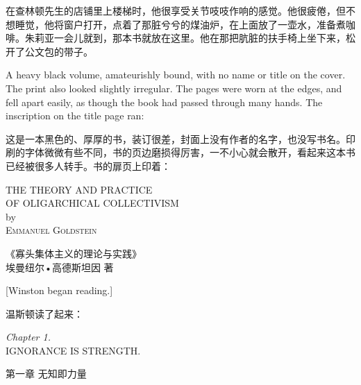 \begin{paracol}{2}
\switchcolumn

在查林顿先生的店铺里上楼梯时，他很享受关节吱吱作响的感觉。他很疲倦，但不想睡觉，他将窗户打开，点着了那脏兮兮的煤油炉，在上面放了一壶水，准备煮咖啡。朱莉亚一会儿就到，那本书就放在这里。他在那把肮脏的扶手椅上坐下来，松开了公文包的带子。

\switchcolumn*

A heavy black volume, amateurishly bound, with no name or title on the
cover. The print also looked slightly irregular. The pages were worn at
the edges, and fell apart easily, as though the book had passed through
many hands. The inscription on the title page ran:

\switchcolumn

这是一本黑色的、厚厚的书，装订很差，封面上没有作者的名字，也没写书名。印刷的字体微微有些不同，书的页边磨损得厉害，一不小心就会散开，看起来这本书已经被很多人转手。书的扉页上印着：

\switchcolumn*

\begin{center}
THE THEORY AND PRACTICE\\
OF OLIGARCHICAL COLLECTIVISM\\
by\\
\textsc{Emmanuel Goldstein}
\end{center}

\switchcolumn

\begin{center}
  《寡头集体主义的理论与实践》\\
  埃曼纽尔•高德斯坦因 著
\end{center}

\switchcolumn*

[Winston began reading.]

\switchcolumn

温斯顿读了起来：

\switchcolumn*

\begin{center}
\emph{Chapter 1.}\\
IGNORANCE IS STRENGTH.
\end{center}

\switchcolumn

\begin{center}
第一章 无知即力量
\end{center}

\switchcolumn*


\end{paracol}
